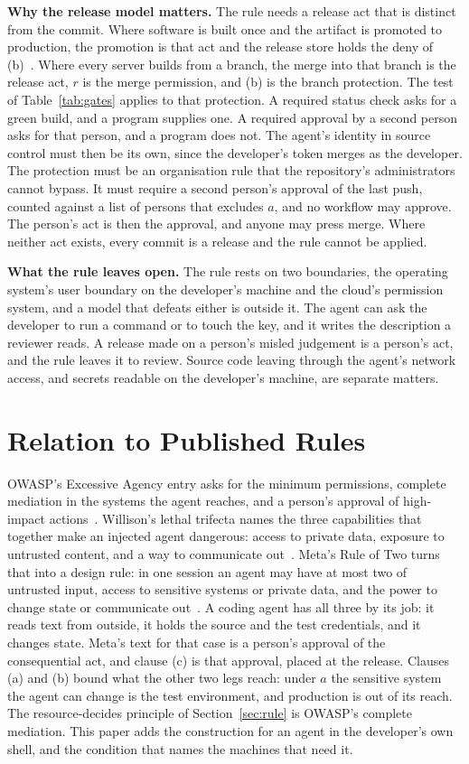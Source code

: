 \documentclass[11pt]{article}
\theoremstyle{definition}
\begin{document}
\textbf{Why the release model matters.} The rule needs a release act that is distinct from the commit. Where software is built once and the artifact is promoted to production, the promotion is that act and the release store holds the deny of (b)~\cite{ControlModel,CaseStudy}. Where every server builds from a branch, the merge into that branch is the release act, $r$ is the merge permission, and (b) is the branch protection. The test of Table~\ref{tab:gates} applies to that protection. A required status check asks for a green build, and a program supplies one. A required approval by a second person asks for that person, and a program does not. The agent's identity in source control must then be its own, since the developer's token merges as the developer. The protection must be an organisation rule that the repository's administrators cannot bypass. It must require a second person's approval of the last push, counted against a list of persons that excludes $a$, and no workflow may approve. The person's act is then the approval, and anyone may press merge. Where neither act exists, every commit is a release and the rule cannot be applied.

\textbf{What the rule leaves open.} The rule rests on two boundaries, the operating system's user boundary on the developer's machine and the cloud's permission system, and a model that defeats either is outside it. The agent can ask the developer to run a command or to touch the key, and it writes the description a reviewer reads. A release made on a person's misled judgement is a person's act, and the rule leaves it to review. Source code leaving through the agent's network access, and secrets readable on the developer's machine, are separate matters.

\section{Relation to Published Rules}
\label{sec:related}

OWASP's Excessive Agency entry asks for the minimum permissions, complete mediation in the systems the agent reaches, and a person's approval of high-impact actions~\cite{OWASP}. Willison's lethal trifecta names the three capabilities that together make an injected agent dangerous: access to private data, exposure to untrusted content, and a way to communicate out~\cite{Willison}. Meta's Rule of Two turns that into a design rule: in one session an agent may have at most two of untrusted input, access to sensitive systems or private data, and the power to change state or communicate out~\cite{MetaRuleOfTwo}. A coding agent has all three by its job: it reads text from outside, it holds the source and the test credentials, and it changes state. Meta's text for that case is a person's approval of the consequential act, and clause (c) is that approval, placed at the release. Clauses (a) and (b) bound what the other two legs reach: under $a$ the sensitive system the agent can change is the test environment, and production is out of its reach. The resource-decides principle of Section~\ref{sec:rule} is OWASP's complete mediation. This paper adds the construction for an agent in the developer's own shell, and the condition that names the machines that need it.
\end{document}
